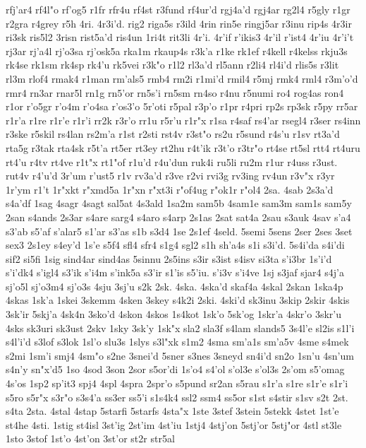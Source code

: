 {rfj'ar4
rf4l"o
rf'og5
r1fr
rfr4u
rf4st
r3fund
rf4ur'd
rgj4a'd
rgj4ar
rg2l4
r5gly
r1gr
r2gra
r4grey
r5h
4ri.
4r3i'd.
rig2
riga5s
r3ild
4rin
rin5e
ringj5ar
r3inu
rip4s
4r3ir
ri3sk
ris5l2
3risn
rist5a'd
ris4un
1ri4t
rit3li
4r'i.
4r'if
r'ikis3
4r'il
r'ist4
4r'iu
4r'i't
rj3ar
rj'a4l
rj'o3sa
rj'osk5a
rka1m
rkaup4s
r3k'a
r1ke
rk1ef
r4kell
r4kelss
rkju3s
rk4se
rk1sm
rk4sp
rk4'u
rk5vei
r3k"o
r1l2
rl3a'd
rl5ann
r2li4
rl4i'd
rlis5s
r3lit
rl3m
rlof4
rmak4
r1man
rm'als5
rmb4
rm2i
r1mi'd
rmil4
r5mj
rmk4
rml4
r3m'o'd
rmr4
rn3ar
rnar5l
rn1g
rn5'or
rn5s'i
rn5sm
rn4so
r4nu
r5numi
ro4
rog4as
ron4
r1or
r'o5gr
r'o4m
r'o4sa
r'os3'o
5r'oti
r5pal
r3p'o
r1pr
r4pri
rp2s
rp3sk
r5py
rr5ar
r1r'a
r1re
r1r'e
r1r'i
rr2k
r3r'o
rr1u
r5r'u
r1r"x
r1sa
r4saf
rs4'ar
rsegl4
r3ser
rs4inn
r3ske
r5skil
rs4lan
rs2m'a
r1st
r2sti
rst4v
r3st"o
rs2u
r5sund
r4s'u
r1sv
rt3a'd
rta5g
r3tak
rta4sk
r5t'a
rt5er
rt3ey
rt2hu
r4t'ik
r3t'o
r3tr"o
rt4se
rt5sl
rtt4
rt4uru
rt4'u
r4tv
rt4ve
r1t"x
rt1"of
r1u'd
r4u'dun
ruk4i
ru5li
ru2m
r1ur
r4uss
r3ust.
rut4v
r4'u'd
3r'um
r'ust5
r1v
rv3a'd
r3ve
r2vi
rvi3g
rv3ing
rv4un
r3v"x
r3yr
1r'ym
r1't
1r"xkt
r"xmd5a
1r"xn
r"xt3i
r"of4ug
r"ok1r
r"ol4
2sa.
4sab
2s3a'd
s4a'df
1sag
4sagr
4sagt
sal5at
4s3ald
1sa2m
sam5b
4sam1e
sam3m
sam1s
sam5y
2san
s4ands
2s3ar
s4are
sarg4
s4aro
s4arp
2s1as
2sat
sat4a
2sau
s3auk
4sav
s'a4
s3'ab
s5'af
s'alar5
s1'ar
s3'as
s1b
s3d4
1se
2s1ef
4seld.
5semi
5sens
2ser
2ses
3set
sex3
2s1ey
s4ey'd
1s'e
s5f4
sfl4
sfr4
s1g4
sgl2
s1h
sh'a4s
s1i
s3i'd.
5s4i'da
s4i'di
sif2
si5fi
1sig
sind4ar
sind4as
5sinnu
2s5ins
s3ir
s3ist
s4isv
si3ta
s'i3br
1s'i'd
s'i'dk4
s'igl4
s3'ik
s'i4m
s'ink5a
s3'ir
s1'is
s5'iu.
s'i3v
s'i4ve
1sj
s3jaf
sjar4
s4j'a
sj'o5l
sj'o3m4
sj'o3s
4sju
3sj'u
s2k
2sk.
4ska.
4ska'd
skaf4a
4skal
2skan
1ska4p
4skas
1sk'a
1skei
3skemm
4sken
3skey
s4k2i
2ski.
4ski'd
sk3inu
3skip
2skir
4skis
3sk'ir
5skj'a
4sk4n
3sko'd
4skon
4skos
1s4kot
1sk'o
5sk'og
1skr'a
4skr'o
3skr'u
4sks
sk3uri
sk3ust
2skv
1sky
3sk'y
1sk"x
sla2
sla3f
s4lam
slands5
3s4l'e
sl2is
s1l'i
s4l'i'd
s3lof
s3lok
1sl'o
slu3s
1slys
s3l"xk
s1m2
4sma
sm'a1s
sm'a5v
4sme
s4mek
s2mi
1sm'i
smj4
4sm"o
s2ne
3snei'd
5sner
s3nes
3sneyd
sn4i'd
sn2o
1sn'u
4sn'um
s4n'y
sn"x'd5
1so
4sod
3son
2sor
s5or'di
1s'o4
s4'ol
s'ol3e
s'ol3s
2s'om
s5'omag
4s'os
1sp2
sp'it3
spj4
4spl
4spra
2spr'o
s5pund
sr2an
s5rau
s1r'a
s1re
s1r'e
s1r'i
s5ro
s5r"x
s3r"o
s3s4'a
ss3er
ss5'i
s1s4k4
ssl2
ssm4
ss5or
s1st
s4stir
s1sv
s2t
2st.
s4ta
2sta.
4stal
4stap
5starfi
5starfs
4sta"x
1ste
3stef
3stein
5stekk
4stet
1st'e
st4he
4sti.
1stig
st4isl
3st'ig
2st'im
4st'iu
1stj4
4stj'on
5stj'or
5stj"or
4stl
st3le
1sto
3stof
1st'o
4st'on
3st'or
st2r
str5al
}
